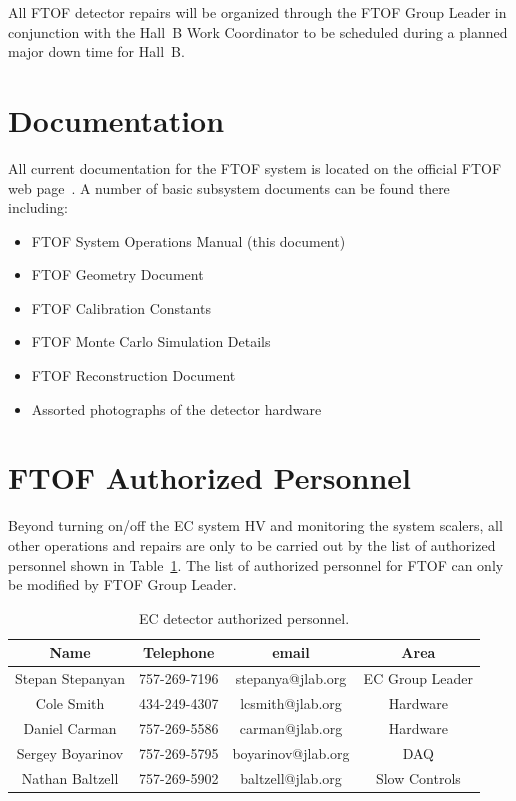 \documentclass[letterpaper,10pt]{article}
\begin{document}
All FTOF detector repairs will be organized through the FTOF Group Leader in conjunction with the
Hall~B Work Coordinator to be scheduled during a planned major down time for Hall~B.

\clearpage

\vfil
\eject

\section{Documentation}

All current documentation for the FTOF system is located on the official FTOF web page~\cite{ftof-web}. 
A number of basic subsystem documents can be found there including:

\begin{itemize}
\item FTOF System Operations Manual (this document)
\item FTOF Geometry Document
\item FTOF Calibration Constants
\item FTOF Monte Carlo Simulation Details
\item FTOF Reconstruction Document
\item Assorted photographs of the detector hardware
\end{itemize}

\section{FTOF Authorized Personnel}
\label{personnel}

Beyond turning on/off the EC system HV and monitoring the system scalers, all other operations and
repairs are only to be carried out by the list of authorized personnel shown in Table~\ref{expert-list}.
The list of authorized personnel for FTOF can only be modified by FTOF Group Leader.

\begin{table}[htbp]
\begin{center}
\begin{tabular} {|c|c|c|c|} \hline
Name             & Telephone    & email              & Area             \\ \hline \hline
Stepan Stepanyan & 757-269-7196 & stepanya@jlab.org  & EC Group Leader  \\ \hline
Cole Smith       & 434-249-4307 & lcsmith@jlab.org   & Hardware         \\ \hline
Daniel Carman    & 757-269-5586 & carman@jlab.org    & Hardware         \\ \hline
Sergey Boyarinov & 757-269-5795 & boyarinov@jlab.org & DAQ              \\ \hline
Nathan Baltzell  & 757-269-5902 & baltzell@jlab.org  & Slow Controls    \\ \hline
\end{tabular}
\caption{EC detector authorized personnel.}
\label{expert-list}
\end{center}
\end{table}
\end{document}
